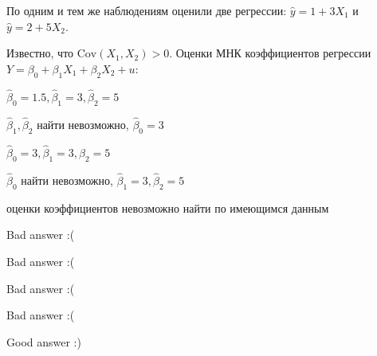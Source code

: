 
\begin{question}
По одним и тем же наблюдениям оценили две регрессии: \(\hat y = 1 + 3X_1\) и \(\hat y = 2 + 5X_2\).

Известно, что \(\widehat{\mathrm{Cov}}(X_1, X_2) > 0\). Оценки МНК коэффициентов регрессии \(Y = \beta_0 + \beta_1 X_1 + \beta_2 X_2 + u\):
\begin{answerlist}
  \item \(\hat \beta_0 = 1.5, \hat \beta_1 = 3, \hat \beta_2 = 5\)
  \item \(\hat \beta_1, \hat \beta_2\) найти невозможно, \(\hat \beta_0 = 3\)
  \item \(\hat \beta_0 = 3, \hat \beta_1 = 3, \hat \beta_2 = 5\)
  \item \(\hat \beta_0\) найти невозможно, \(\hat \beta_1 = 3, \hat \beta_2 = 5\)
  \item оценки коэффициентов невозможно найти по имеющимся данным
\end{answerlist}
\end{question}

\begin{solution}
\begin{answerlist}
  \item Bad answer :(
  \item Bad answer :(
  \item Bad answer :(
  \item Bad answer :(
  \item Good answer :)
\end{answerlist}
\end{solution}

